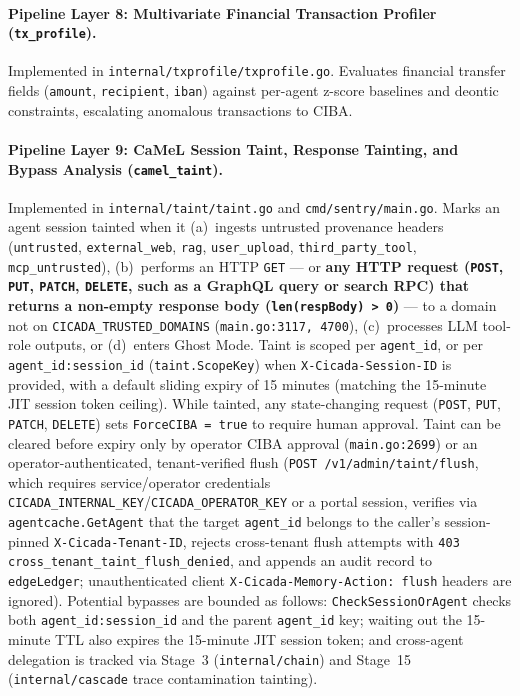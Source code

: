 \documentclass[11pt, a4paper]{article}
\begin{document}
\paragraph{Pipeline Layer 8: Multivariate Financial Transaction Profiler (\texttt{tx\_profile}).}
Implemented in \texttt{internal/txprofile/txprofile.go}. Evaluates financial transfer fields (\texttt{amount}, \texttt{recipient}, \texttt{iban}) against per-agent z-score baselines and deontic constraints, escalating anomalous transactions to CIBA.

\paragraph{Pipeline Layer 9: CaMeL Session Taint, Response Tainting, and Bypass Analysis (\texttt{camel\_taint}).}
Implemented in \texttt{internal/taint/taint.go} and \texttt{cmd/sentry/main.go}. Marks an agent session tainted when it (a)~ingests untrusted provenance headers (\texttt{untrusted}, \texttt{external\_web}, \texttt{rag}, \texttt{user\_upload}, \texttt{third\_party\_tool}, \texttt{mcp\_untrusted}), (b)~performs an HTTP \texttt{GET} --- or \textbf{any HTTP request (\texttt{POST}, \texttt{PUT}, \texttt{PATCH}, \texttt{DELETE}, such as a GraphQL query or search RPC) that returns a non-empty response body (\texttt{len(respBody) > 0})} --- to a domain not on \texttt{CICADA\_TRUSTED\_DOMAINS} (\texttt{main.go:3117, 4700}), (c)~processes LLM tool-role outputs, or (d)~enters Ghost Mode. Taint is scoped per \texttt{agent\_id}, or per \texttt{agent\_id:session\_id} (\texttt{taint.ScopeKey}) when \texttt{X-Cicada-Session-ID} is provided, with a default sliding expiry of 15 minutes (matching the 15-minute JIT session token ceiling). While tainted, any state-changing request (\texttt{POST}, \texttt{PUT}, \texttt{PATCH}, \texttt{DELETE}) sets \texttt{ForceCIBA = true} to require human approval. Taint can be cleared before expiry only by operator CIBA approval (\texttt{main.go:2699}) or an operator-authenticated, tenant-verified flush (\texttt{POST /v1/admin/taint/flush}, which requires service/operator credentials \texttt{CICADA\_INTERNAL\_KEY}/\texttt{CICADA\_OPERATOR\_KEY} or a portal session, verifies via \texttt{agentcache.GetAgent} that the target \texttt{agent\_id} belongs to the caller's session-pinned \texttt{X-Cicada-Tenant-ID}, rejects cross-tenant flush attempts with \texttt{403 cross\_tenant\_taint\_flush\_denied}, and appends an audit record to \texttt{edgeLedger}; unauthenticated client \texttt{X-Cicada-Memory-Action: flush} headers are ignored). Potential bypasses are bounded as follows: \texttt{CheckSessionOrAgent} checks both \texttt{agent\_id:session\_id} and the parent \texttt{agent\_id} key; waiting out the 15-minute TTL also expires the 15-minute JIT session token; and cross-agent delegation is tracked via Stage~3 (\texttt{internal/chain}) and Stage~15 (\texttt{internal/cascade} trace contamination tainting).
\end{document}
